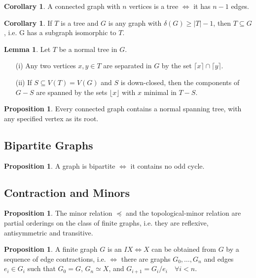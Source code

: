 \documentclass[12pt]{article}
\theoremstyle{plain}
\theoremstyle{definition}
\newtheorem{proposition}[theorem]{Proposition}
\newtheorem{corollary}[theorem]{Corollary}
\newtheorem{lemma}[theorem]{Lemma}
\begin{document}
\begin{corollary}
  A connected graph with $n$ vertices is a tree $\iff$ it has $n - 1$ edges.
\end{corollary}

\begin{corollary}
  If $T$ is a tree and $G$ is any graph with $\delta(G) \geq |T| - 1$, then $T \subseteq G$, i.e. G has a subgraph isomorphic to $T$.
\end{corollary}

\begin{lemma}
  Let $T$ be a normal tree in $G$.
  \begin{enumerate}
    \item[(i)] Any two vertices $x, y \in T$ are separated in $G$ by the set $\lceil x\rceil \cap \lceil y \rceil$.
    \item[(ii)] If $S \subseteq V(T) = V(G)$ and $S$ is down-closed, then the components of $G - S$ are spanned by the sets $\lfloor x \rfloor$ with $x$ minimal in $T - S$.
  \end{enumerate}
\end{lemma}

\begin{proposition}
  Every connected graph contains a normal spanning tree, with any specified vertex as its root.
\end{proposition}

\subsection{Bipartite Graphs}
\begin{proposition}
  A graph is bipartite $\iff$ it contains no odd cycle.
\end{proposition}

\subsection{Contraction and Minors}
\begin{proposition}
  The minor relation $\preceq$ and the topological-minor relation are partial orderings on the class of finite graphs, i.e. they are reflexive, antisymmetric and transitive.
\end{proposition}

\begin{proposition}
  A finite graph $G$ is an $IX \iff X$ can be obtained from $G$ by a sequence of edge contractions, i.e. $\iff$ there are graphs $G_{0}, \dots, G_{n}$ and edges $e_{i} \in G_{i}$ such that $G_{0} = G$, $G_{n} \simeq X$, and $G_{i+1} = G_{i}/e_{i} \quad \forall i < n$.
\end{proposition}
\end{document}
